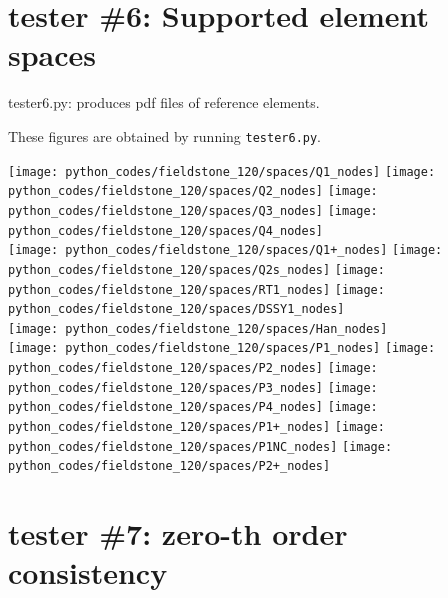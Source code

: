 \section*{tester \#6: Supported element spaces}

{\pythonfile tester6.py}: produces pdf files of reference elements.

These figures are obtained by running \lstinline{tester6.py}.

\begin{center}
\texttt{[image: python\_codes/fieldstone\_120/spaces/Q1\_nodes]}
\texttt{[image: python\_codes/fieldstone\_120/spaces/Q2\_nodes]}
\texttt{[image: python\_codes/fieldstone\_120/spaces/Q3\_nodes]}
\texttt{[image: python\_codes/fieldstone\_120/spaces/Q4\_nodes]}\\
\texttt{[image: python\_codes/fieldstone\_120/spaces/Q1+\_nodes]}
\texttt{[image: python\_codes/fieldstone\_120/spaces/Q2s\_nodes]}
\texttt{[image: python\_codes/fieldstone\_120/spaces/RT1\_nodes]}
\texttt{[image: python\_codes/fieldstone\_120/spaces/DSSY1\_nodes]}\\
\texttt{[image: python\_codes/fieldstone\_120/spaces/Han\_nodes]}\\
\texttt{[image: python\_codes/fieldstone\_120/spaces/P1\_nodes]}
\texttt{[image: python\_codes/fieldstone\_120/spaces/P2\_nodes]}
\texttt{[image: python\_codes/fieldstone\_120/spaces/P3\_nodes]}
\texttt{[image: python\_codes/fieldstone\_120/spaces/P4\_nodes]}
\texttt{[image: python\_codes/fieldstone\_120/spaces/P1+\_nodes]}
\texttt{[image: python\_codes/fieldstone\_120/spaces/P1NC\_nodes]}
\texttt{[image: python\_codes/fieldstone\_120/spaces/P2+\_nodes]}
\end{center}


\newpage
\section*{tester \#7: zero-th order consistency}

